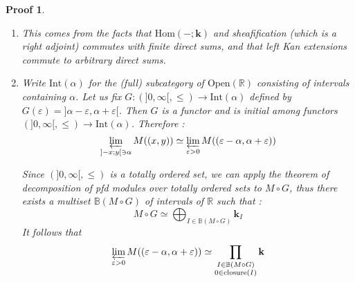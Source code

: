 \documentclass[a4paper, english, 11pt]{article}
\newcommand{\kk}[0]{\textbf{k}}
\newcommand{\0}{\vec{0}}
\newcommand{\R}[0]{\mathbb{R}}
\newcommand{\Ouv}[0]{\mathrm{Open}}
\newcommand{\Hom}[0]{\text{Hom}}
\newtheorem*{pf}{Proof} }
\begin{document}
\begin{pf}
\begin{enumerate}
a direct consequence of the proof and the proof of property (1).
    \item This comes from the facts that $\Hom(-;\kk)$ and sheafification (which is a right adjoint) commutes with finite direct sums, and that left Kan extensions commute to arbitrary direct sums.
    \item Write $\text{Int}(\alpha)$ for the (full) subcategory of $\Ouv(\R)$ consisting of intervals containing $\alpha$. Let us fix  $G :  (]0,\infty[,\leq)  \longrightarrow \text{Int}(\alpha)$ defined by 
  $G(\varepsilon) = ]\alpha - \varepsilon , \alpha + \varepsilon[  $. Then $G$ is a functor and is initial among functors $ (]0,\infty[,\leq)  \longrightarrow \text{Int}(\alpha)$. Therefore : 
     $$ \varprojlim_{]-x;y[\ni \alpha}M((x,y)) \simeq \varprojlim_{\varepsilon > 0}M((\varepsilon - \alpha  , \alpha + \varepsilon)) $$
     
     
     Since $(]0,\infty[,\leq) $ is a totally ordered set, we can apply the theorem of decomposition of pfd modules over totally ordered sets to $M\circ G$, thus there exists a multiset $\mathbb{B}(M\circ G)$ of intervals of $\R$ such that : 
     \begin{equation}\label{eq:DefMoG} M\circ G \simeq \bigoplus_{I\in \mathbb{B}(M\circ G)} \kk_I \end{equation}
    It follows that \begin{equation}\label{eq:porjlimM} \varprojlim_{\varepsilon > 0}M((\varepsilon - \alpha  , \alpha + \varepsilon)) \simeq \prod_{\substack{I\in \mathbb{B}(M\circ G)\\ 0 \in \text{closure}(I)}} \kk  \end{equation}
                                                                                                                                                                                                                  

\end{enumerate}
\end{pf}
\end{document}
